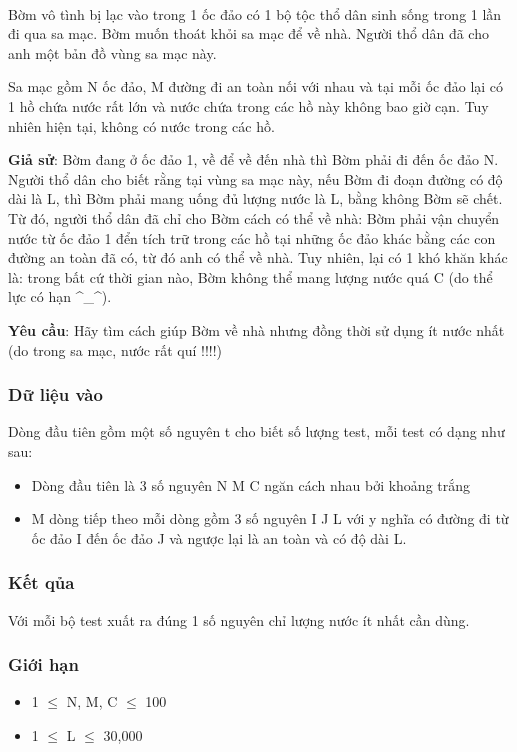 

 

Bờm vô tình bị lạc vào trong 1 ốc đảo có 1 bộ tộc thổ dân sinh sống trong 1 lần đi qua sa mạc. Bờm muốn thoát khỏi sa mạc để về nhà. Người thổ dân đã cho anh một bản đồ vùng sa mạc này.

Sa mạc gồm N ốc đảo, M đường đi an toàn nối với nhau và tại mỗi ốc đảo lại có 1 hồ chứa nước rất lớn và nước chứa trong các hồ này không bao giờ cạn. Tuy nhiên hiện tại, không có nước trong các hồ.

\textbf{Giả sử}: Bờm đang ở ốc đảo 1, về để về đến nhà thì Bờm phải đi đến ốc đảo N. Người thổ dân cho biết rằng tại vùng sa mạc này, nếu Bờm đi đoạn đường có độ dài là L, thì Bờm phải mang uống đủ lượng nước là L, bằng không Bờm sẽ chết. Từ đó, người thổ dân đã chỉ cho Bờm cách có thể về nhà: Bờm phải vận chuyển nước từ ốc đảo 1 đển tích trữ trong các hồ tại những ốc đảo khác bằng các con đường an toàn đã có, từ đó anh có thể về nhà. Tuy nhiên, lại có 1 khó khăn khác là: trong bất cứ thời gian nào, Bờm không thể mang lượng nước quá C (do thể lực có hạn \textasciicircum\_\textasciicircum).

\textbf{Yêu cầu}: Hãy tìm cách giúp Bờm về nhà nhưng đồng thời sử dụng ít nước nhất (do trong sa mạc, nước rất quí !!!!)

\subsubsection{Dữ liệu vào}

Dòng đầu tiên gồm một số nguyên t cho biết số lượng test, mỗi test có dạng như sau:
\begin{itemize}
	\item Dòng đầu tiên là 3 số nguyên N M C ngăn cách nhau bởi khoảng trắng
	\item M dòng tiếp theo mỗi dòng gồm 3 số nguyên I J L với y nghĩa có đường đi từ ốc đảo I đến ốc đảo J và ngược lại là an toàn và có độ dài L.
\end{itemize}

\subsubsection{Kết qủa}

Với mỗi bộ test xuất ra đúng 1 số nguyên chỉ lượng nước ít nhất cần dùng.

\subsubsection{Giới hạn}
\begin{itemize}
	\item 1  $\le$  N, M, C  $\le$  100
	\item 1  $\le$  L  $\le$  30,000
\end{itemize}


